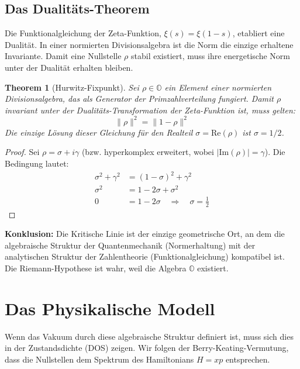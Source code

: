 \documentclass[11pt, a4paper]{article}
\newtheorem{theorem}{Theorem}[section]
\begin{document}
	\subsection{Das Dualitäts-Theorem}
	Die Funktionalgleichung der Zeta-Funktion, $\xi(s) = \xi(1-s)$, etabliert eine Dualität. In einer normierten Divisionsalgebra ist die Norm die einzige erhaltene Invariante. Damit eine Nullstelle $\rho$ stabil existiert, muss ihre \glqq energetische\grqq{} Norm unter der Dualität erhalten bleiben.
	
	\begin{theorem}[Hurwitz-Fixpunkt]
		Sei $\rho \in \mathbb{O}$ ein Element einer normierten Divisionsalgebra, das als Generator der Primzahlverteilung fungiert. Damit $\rho$ invariant unter der Dualitäts-Transformation der Zeta-Funktion ist, muss gelten:
		\begin{equation}
			\|\rho\|^2 = \|1-\rho\|^2
		\end{equation}
		Die einzige Lösung dieser Gleichung für den Realteil $\sigma = \text{Re}(\rho)$ ist $\sigma = 1/2$.
	\end{theorem}
	
	\begin{proof}
		Sei $\rho = \sigma + i\gamma$ (bzw. hyperkomplex erweitert, wobei $|\text{Im}(\rho)| = \gamma$).
		Die Bedingung lautet:
		\begin{align}
			\sigma^2 + \gamma^2 &= (1-\sigma)^2 + \gamma^2 \\
			\sigma^2 &= 1 - 2\sigma + \sigma^2 \\
			0 &= 1 - 2\sigma \quad \Rightarrow \quad \sigma = \frac{1}{2}
		\end{align}
	\end{proof}
	
	\textbf{Konklusion:} Die Kritische Linie ist der einzige geometrische Ort, an dem die algebraische Struktur der Quantenmechanik (Normerhaltung) mit der analytischen Struktur der Zahlentheorie (Funktionalgleichung) kompatibel ist. Die Riemann-Hypothese ist wahr, weil die Algebra $\mathbb{O}$ existiert.
	
	\section{Das Physikalische Modell}
	
	Wenn das Vakuum durch diese algebraische Struktur definiert ist, muss sich dies in der Zustandsdichte (DOS) zeigen. Wir folgen der Berry-Keating-Vermutung, dass die Nullstellen dem Spektrum des Hamiltonians $H=xp$ entsprechen.
	
\end{document}
